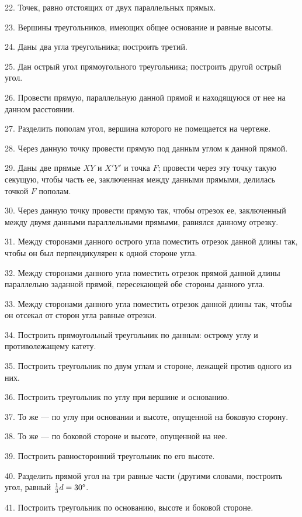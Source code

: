 \documentclass[oneside]{book}
\begin{document}
22.
Точек, равно отстоящих от двух параллельных прямых.

23.
Вершины треугольников, имеющих общее основание и равные высоты.


24.
Даны два угла треугольника;
построить третий.

25.
Дан острый угол прямоугольного треугольника;
построить другой острый угол.

26.
Провести прямую, параллельную данной прямой и находящуюся от нее на данном расстоянии.

27.
Разделить пополам угол, вершина которого не помещается на чертеже.

28.
Через данную точку провести прямую под данным углом к данной прямой.

29.
Даны две прямые $XY$ и $X'Y'$ и точка $F$;
провести через эту точку такую секущую, чтобы часть ее, заключенная между данными прямыми, делилась точкой $F$ пополам.

30.
Через данную точку провести прямую так, чтобы отрезок ее, заключенный между двумя данными параллельными прямыми, равнялся данному отрезку.

31.
Между сторонами данного острого угла поместить отрезок данной длины так, чтобы он был перпендикулярен к одной стороне угла.

32.
Между сторонами данного угла поместить отрезок прямой данной длины параллельно заданной прямой, пересекающей обе стороны данного угла.

33.
Между сторонами данного угла поместить отрезок данной длины так, чтобы он отсекал от сторон угла равные отрезки.

34.
Построить прямоугольный треугольник по данным:
острому углу и противолежащему катету.

35.
Построить треугольник по двум углам и стороне, лежащей против одного из них.

36.
Построить  треугольник по углу при вершине и основанию.


37.
То же — по углу при основании и высоте, опущенной на боковую сторону.

38.
То же — по боковой стороне и высоте, опущенной на нее.

39.
Построить равносторонний треугольник по его высоте.

40.
Разделить прямой угол на три равные части (другими словами, построить угол, равный  $\tfrac13d=30\degree$.

41.
Построить треугольник по основанию, высоте и боковой стороне.
\end{document}
